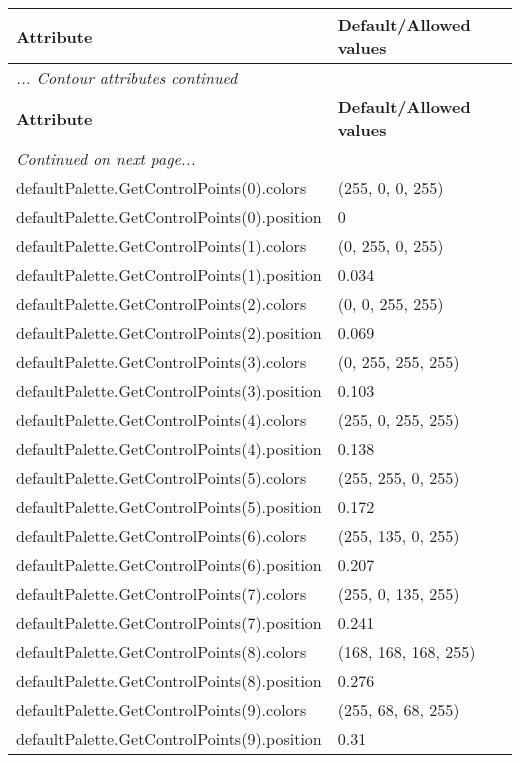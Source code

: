 \documentclass[10pt,a4paper]{report}
\begin{document}
\begin{longtable}{lp{7.5cm}}
{\bf Attribute} & {\bf Default/Allowed values} \\
\hline \hline
\endfirsthead
\multicolumn{2}{l}{{\it ... Contour attributes continued}} \\
{\bf Attribute} & {\bf Default/Allowed values} \\
\hline \hline
\endhead
\hline
\multicolumn{2}{l}{{\it Continued on next page...}} \\
\endfoot
\hline
\endlastfoot

defaultPalette.GetControlPoints(0).colors  &  (255, 0, 0, 255) \\
defaultPalette.GetControlPoints(0).position  &  0 \\
defaultPalette.GetControlPoints(1).colors  &  (0, 255, 0, 255) \\
defaultPalette.GetControlPoints(1).position  &  0.034 \\
defaultPalette.GetControlPoints(2).colors  &  (0, 0, 255, 255) \\
defaultPalette.GetControlPoints(2).position  &  0.069 \\
defaultPalette.GetControlPoints(3).colors  &  (0, 255, 255, 255) \\
defaultPalette.GetControlPoints(3).position  &  0.103 \\
defaultPalette.GetControlPoints(4).colors  &  (255, 0, 255, 255) \\
defaultPalette.GetControlPoints(4).position  &  0.138 \\
defaultPalette.GetControlPoints(5).colors  &  (255, 255, 0, 255) \\
defaultPalette.GetControlPoints(5).position  &  0.172 \\
defaultPalette.GetControlPoints(6).colors  &  (255, 135, 0, 255) \\
defaultPalette.GetControlPoints(6).position  &  0.207 \\
defaultPalette.GetControlPoints(7).colors  &  (255, 0, 135, 255) \\
defaultPalette.GetControlPoints(7).position  &  0.241 \\
defaultPalette.GetControlPoints(8).colors  &  (168, 168, 168, 255) \\
defaultPalette.GetControlPoints(8).position  &  0.276 \\
defaultPalette.GetControlPoints(9).colors  &  (255, 68, 68, 255) \\
defaultPalette.GetControlPoints(9).position  &  0.31 \\

\end{longtable}
\end{document}
